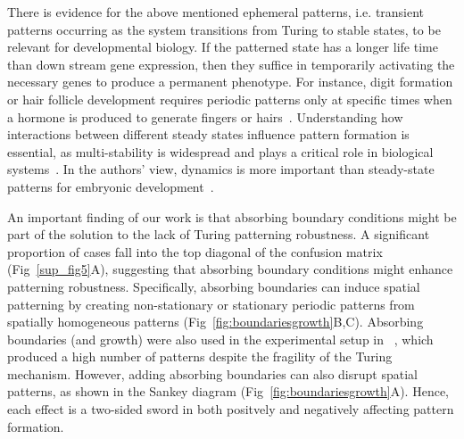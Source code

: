 There is evidence for the above mentioned ephemeral patterns, i.e. transient patterns occurring as the system transitions from Turing to stable states, to be relevant for developmental biology. If the patterned state has a longer life time than down stream gene expression, then they suffice in temporarily activating the necessary genes to produce a permanent phenotype.
For instance, digit formation or hair follicle development requires periodic patterns only at specific times when a hormone is produced to generate fingers or hairs~\parencite{raspopovic2014digit,glover2023developmental}. 
Understanding how interactions between different steady states influence pattern formation is essential, as multi-stability is widespread and plays a critical role in biological systems~\parencite{laurent1999multistability}. In the authors' view, dynamics is more important than steady-state patterns for embryonic development~\parencite{pezzotta2023optimal}.


An important finding of our work is that absorbing boundary conditions might be part of the solution to the lack of Turing patterning robustness. A significant proportion of cases fall into the top diagonal of the confusion matrix (Fig~\ref{sup_fig5}A), suggesting that absorbing boundary conditions might enhance patterning robustness.
Specifically, absorbing boundaries can induce spatial patterning by creating non-stationary or stationary periodic patterns from spatially homogeneous patterns (Fig~\ref{fig:boundariesgrowth}B,C). Absorbing boundaries (and growth) were also used in the experimental setup in ~\parencite{Oliver2023}, which produced a high number of patterns despite the fragility of the Turing mechanism. However, adding absorbing boundaries can also disrupt spatial patterns, as shown in the Sankey diagram (Fig~\ref{fig:boundariesgrowth}A). Hence, each effect is a two-sided sword in both positvely and negatively affecting pattern formation.

